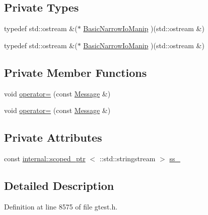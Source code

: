 \subsection*{\-Private \-Types}
\begin{DoxyCompactItemize}
\item 
typedef std\-::ostream \&($\ast$ \hyperlink{classtesting_1_1Message_ae41100e7f6db1696cd6282c56c1528b3}{\-Basic\-Narrow\-Io\-Manip} )(std\-::ostream \&)
\item 
typedef std\-::ostream \&($\ast$ \hyperlink{classtesting_1_1Message_ae41100e7f6db1696cd6282c56c1528b3}{\-Basic\-Narrow\-Io\-Manip} )(std\-::ostream \&)
\end{DoxyCompactItemize}
\subsection*{\-Private \-Member \-Functions}
\begin{DoxyCompactItemize}
\item 
void \hyperlink{classtesting_1_1Message_a88dc4315c7a87800e16ed76f3d278b08}{operator=} (const \hyperlink{classtesting_1_1Message}{\-Message} \&)
\item 
void \hyperlink{classtesting_1_1Message_a88dc4315c7a87800e16ed76f3d278b08}{operator=} (const \hyperlink{classtesting_1_1Message}{\-Message} \&)
\end{DoxyCompactItemize}
\subsection*{\-Private \-Attributes}
\begin{DoxyCompactItemize}
\item 
const \hyperlink{classtesting_1_1internal_1_1scoped__ptr}{internal\-::scoped\-\_\-ptr}\*
$<$ \-::std\-::stringstream $>$ \hyperlink{classtesting_1_1Message_a7ea18128a6a40e3774ee8148ce4f77f3}{ss\-\_\-}
\end{DoxyCompactItemize}


\subsection{\-Detailed \-Description}


\-Definition at line 8575 of file gtest.\-h.



